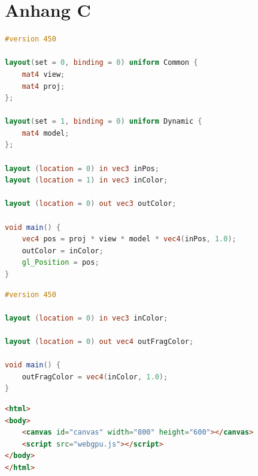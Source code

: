 \documentclass[oneside]{ausarbeitung}
\begin{document}
\chapter{Anhang C}
\label{appendix:c}
\begin{lstlisting}[language=glsl, label={lst:vert_full}, caption={Kompletter GLSL-Code des Vertex-Shaders für das Minimalbeispiel aus Kapitel \ref{cha:example}}]
#version 450

layout(set = 0, binding = 0) uniform Common {
    mat4 view;
    mat4 proj;
};

layout(set = 1, binding = 0) uniform Dynamic {
    mat4 model;
};

layout (location = 0) in vec3 inPos;
layout (location = 1) in vec3 inColor;

layout (location = 0) out vec3 outColor;

void main() {
    vec4 pos = proj * view * model * vec4(inPos, 1.0);
    outColor = inColor;
    gl_Position = pos;
}
\end{lstlisting}
\begin{lstlisting}[language=glsl, label={lst:fragment_shader}, caption={Kompletter GLSL-Code des Fragment-Shaders für das Minimalbeispiel aus Kapitel \ref{cha:example}}]
#version 450

layout (location = 0) in vec3 inColor;

layout (location = 0) out vec4 outFragColor;

void main() {
    outFragColor = vec4(inColor, 1.0);
}
\end{lstlisting}
\begin{lstlisting}[language=HTML, label={lst:html_full}, caption={Kompletter HTML-Quellcode für das Minimalbeispiel aus Kapitel \ref{cha:example}}]
<html>
<body>
    <canvas id="canvas" width="800" height="600"></canvas>
    <script src="webgpu.js"></script>
</body>
</html>
\end{lstlisting}
\end{document}
